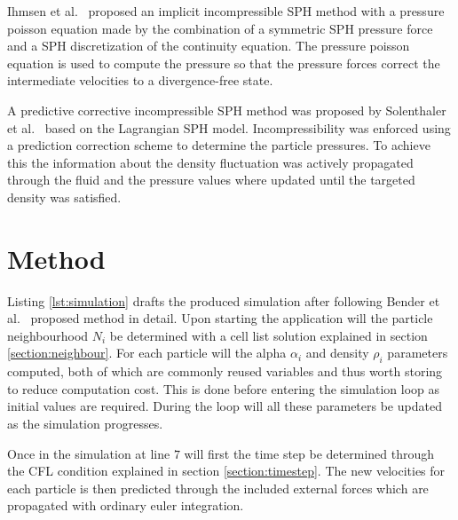     Ihmsen et al.~\cite{ihmsen2014implicit} proposed an implicit incompressible SPH method with a pressure poisson equation made by the combination of a symmetric SPH pressure force and a SPH discretization of the continuity equation.
    The pressure poisson equation is used to compute the pressure so that the pressure forces correct the intermediate velocities to a divergence-free state.
    
    A predictive corrective incompressible SPH method was proposed by Solenthaler et al.~\cite{solenthaler} based on the Lagrangian SPH model.
    Incompressibility was enforced using a prediction correction scheme to determine the particle pressures.
    To achieve this the information about the density fluctuation was actively propagated through the fluid and the pressure values where updated until the targeted density was satisfied.


\section{Method}

Listing \ref{lst:simulation} drafts the produced simulation after following Bender et al.~\cite{bender} proposed method in detail. Upon starting the application will the particle neighbourhood $N_i$ be determined with a cell list solution explained in section \ref{section:neighbour}. For each particle will the alpha $\alpha_i$ and density $\rho_i$ parameters computed, both of which are commonly reused variables and thus worth storing to reduce computation cost. This is done before entering the simulation loop as initial values are required. During the loop will all these parameters be updated as the simulation progresses.

Once in the simulation at line $7$ will first the time step be determined through the CFL condition explained in section \ref{section:timestep}. The new velocities for each particle is then predicted through the included external forces which are propagated with ordinary euler integration.

